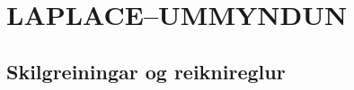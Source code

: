 \newenvironment{se}{\begin{setning+}\sl}{\hfill$\square$\end{setning+}\rm}
\newenvironment{sex}{\begin{setning+}\sl}{\hfill$\blacksquare$\end{setning+}\rm}
\newenvironment{sk}{\begin{skilgreining+}\rm}{\hfill$\square$\end{skilgreining+}\rm}
\newenvironment{sesk}{\begin{setningogskilgreining+}\rm}{\hfill$\square$\end{setningogskilgreining+}\rm}
\newenvironment{hs}{\begin{hjalparsetning+}\sl}{\hfill$\square$\end{hjalparsetning+}\rm}
\newenvironment{fs}{\begin{fylgisetning+}\sl}{\hfill$\square$\end{fylgisetning+}\rm}
\newenvironment{sy}{\begin{synidaemi+}\rm}{\hfill$\square$\end{synidaemi+}\rm}
\newenvironment{fo}{\begin{forrit+}\rm}{\hfill\end{forrit+}\rm}
\newenvironment{so}{\medbreak\noindent{\it Sönnun:}\rm}{\hfill$\blacksquare$\rm}
\newenvironment{sotx}[1]{\medbreak\noindent{\it #1:}\rm}{\hfill$\blacksquare$\rm}
\newcommand{\aefing}{\section{Æfingardæmi} \setcounter{daemateljari}{1}}
\newcommand{\daemi}{
{\medskip\noindent{\bf \thedaemateljari.}}
\addtocounter{daemateljari}{1}
}

\def\svar#1{\smallskip\noindent{\bf #1.} \ }
\def\lausn#1{\smallskip\noindent{\bf #1.} \ }
\def\ugrein#1{\medbreak\noindent{\bf #1.} }
\newcommand{\samantekt}{\noindent{\bf Samantekt.} }

%

\chapter {LAPLACE--UMMYNDUN}
 

\section{ Skilgreiningar og reiknireglur}

